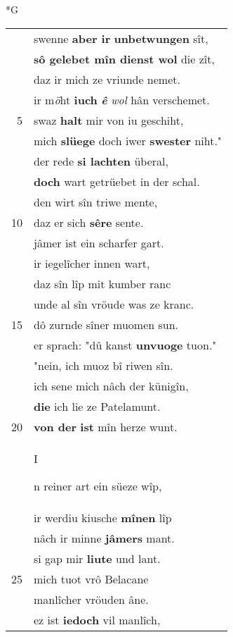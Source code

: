 \documentclass[8pt,a4paper,notitlepage]{article}
\begin{document}
\begin{table}[ht]
\begin{minipage}[t]{0.5\linewidth}
\small
\begin{center}*G
\end{center}
\begin{tabular}{rl}
 & swenne \textbf{aber ir} \textbf{unbetwungen} sît,\\ 
 & \textbf{sô gelebet mîn dienst wol} die zît,\\ 
 & daz ir mich ze vriunde nemet.\\ 
 & ir m\textit{ö}ht \textbf{iuch} \textit{\textbf{ê}} \textit{wol} hân verschemet.\\ 
5 & swaz \textbf{halt} mir von iu geschiht,\\ 
 & mich \textbf{slüege} doch iwer \textbf{swester} niht."\\ 
 & der rede \textbf{si lachten} überal,\\ 
 & \textbf{doch} wart getrüebet in der schal.\\ 
 & den wirt sîn triwe mente,\\ 
10 & daz er sich \textbf{sêre} sente.\\ 
 & jâmer ist ein scharfer gart.\\ 
 & ir iegelîcher innen wart,\\ 
 & daz sîn lîp mit kumber ranc\\ 
 & unde al sîn vröude was ze kranc.\\ 
15 & dô zurnde sîner muomen sun.\\ 
 & er sprach: "dû kanst \textbf{unvuoge} tuon."\\ 
 & "nein, ich muoz bî riwen sîn.\\ 
 & ich sene mich nâch der künigîn,\\ 
 & \textbf{die} ich lie ze Patelamunt.\\ 
20 & \textbf{von der} \textbf{ist} mîn herze wunt.\\ 
 & \begin{large}I\end{large}n reiner art ein süeze wîp,\\ 
 & ir werdiu kiusche \textbf{mînen} lîp\\ 
 & nâch ir minne \textbf{jâmers} mant.\\ 
 & si gap mir \textbf{liute} und lant.\\ 
25 & mich tuot vrô Belacane\\ 
 & manlîcher vröuden âne.\\ 
 & ez ist \textbf{iedoch} vil manlîch,\\ 

\end{tabular}
\end{minipage}
\end{table}
\end{document}
